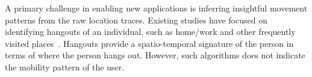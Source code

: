 
A primary challenge in enabling new applications is inferring insightful movement patterns from the raw location traces. Existing studies have focused on identifying hangouts of an individual, such as home/work and other frequently visited places~\cite{Do2014}. Hangouts provide a spatio-temporal signature of the person in terms of where the person hangs out. However, such algorithms does not indicate the mobility pattern of the user. 

